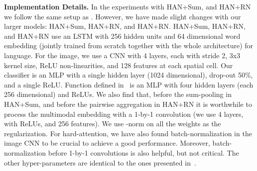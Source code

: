 \noindent\textbf{Implementation Details.}
 In the experiments with HAN+Sum, and HAN+RN we follow the same setup as \cite{santoro2017simple}. However, we have made slight changes with our larger models: HAN+Sum, HAN+RN, and HAN+RN.
  HAN+Sum, HAN+RN, and HAN+RN use an LSTM with 256 hidden units and 64 dimensional word embedding (jointly trained from scratch together with the whole architecture) for language.  For the image, we use a CNN with 4 layers, each with stride 2, 3x3 kernel size, ReLU non-linearities, and 128 features at each spatial cell.  Our classifier  is an MLP with a single hidden layer (1024 dimensional),  drop-out 50\%, and a single ReLU. Function  defined in~\cite{santoro2017simple} is an MLP with four hidden layers (each 256 dimensional) and ReLUs. We also find that, before the sum-pooling in HAN+Sum, and before the pairwise aggregation in HAN+RN it is worthwhile to process the multimodal embedding with a 1-by-1 convolution (we use 4 layers, with ReLUs, and 256 features). We use -norm on all the weights as the regularization. For hard-attention, we have also found batch-normalization in the image CNN to be crucial to achieve a good performance. Moreover, batch-normalization before 1-by-1 convolutions is also helpful, but not critical. The other hyper-parameters are identical to the ones presented in~\cite{santoro2017simple}.

